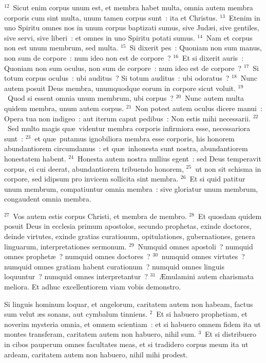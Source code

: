 ${}^{12}$~Sicut enim corpus unum est, et membra habet multa, omnia autem membra corporis cum sint multa, unum tamen corpus sunt~: ita et Christus.
${}^{13}$~Etenim in uno Spiritu omnes nos in unum corpus baptizati sumus, sive Jud\ae i, sive gentiles, sive servi, sive liberi~: et omnes in uno Spiritu potati sumus.
${}^{14}$~Nam et corpus non est unum membrum, sed multa.
${}^{15}$~Si dixerit pes~: Quoniam non sum manus, non sum de corpore~: num ideo non est de corpore~?
${}^{16}$~Et si dixerit auris~: Quoniam non sum oculus, non sum de corpore~: num ideo est de corpore~?
${}^{17}$~Si totum corpus oculus~: ubi auditus~? Si totum auditus~: ubi odoratus~?
${}^{18}$~Nunc autem posuit Deus membra, unumquodque eorum in corpore sicut voluit.
${}^{19}$~Quod si essent omnia unum membrum, ubi corpus~?
${}^{20}$~Nunc autem multa quidem membra, unum autem corpus.
${}^{21}$~Non potest autem oculus dicere manui~: Opera tua non indigeo~: aut iterum caput pedibus~: Non estis mihi necessarii.
${}^{22}$~Sed multo magis qu\ae\ videntur membra corporis infirmiora esse, necessariora sunt~:
${}^{23}$~et qu\ae\ putamus ignobiliora membra esse corporis, his honorem abundantiorem circumdamus~: et qu\ae\ inhonesta sunt nostra, abundantiorem honestatem habent.
${}^{24}$~Honesta autem nostra nullius egent~: sed Deus temperavit corpus, ei cui deerat, abundantiorem tribuendo honorem,
${}^{25}$~ut non sit schisma in corpore, sed idipsum pro invicem sollicita sint membra.
${}^{26}$~Et si quid patitur unum membrum, compatiuntur omnia membra~: sive gloriatur unum membrum, congaudent omnia membra.


${}^{27}$~Vos autem estis corpus Christi, et membra de membro.
${}^{28}$~Et quosdam quidem posuit Deus in ecclesia primum apostolos, secundo prophetas, exinde doctores, deinde virtutes, exinde gratias curationum, opitulationes, gubernationes, genera linguarum, interpretationes sermonum.
${}^{29}$~Numquid omnes apostoli~? numquid omnes prophet\ae~? numquid omnes doctores~?
${}^{30}$~numquid omnes virtutes~? numquid omnes gratiam habent curationum~? numquid omnes linguis loquuntur~? numquid omnes interpretantur~?
${}^{31}$~\AE mulamini autem charismata meliora. Et adhuc excellentiorem viam vobis demonstro.

\lettrine[lines=3,image=true,loversize=0.05,lraise=-0.03]{S}{}i linguis hominum loquar, et angelorum, caritatem autem non habeam, factus sum velut \ae s sonans, aut cymbalum tinniens.
${}^{2}$~Et si habuero prophetiam, et noverim mysteria omnia, et omnem scientiam~: et si habuero omnem fidem ita ut montes transferam, caritatem autem non habuero, nihil sum.
${}^{3}$~Et si distribuero in cibos pauperum omnes facultates meas, et si tradidero corpus meum ita ut ardeam, caritatem autem non habuero, nihil mihi prodest.


